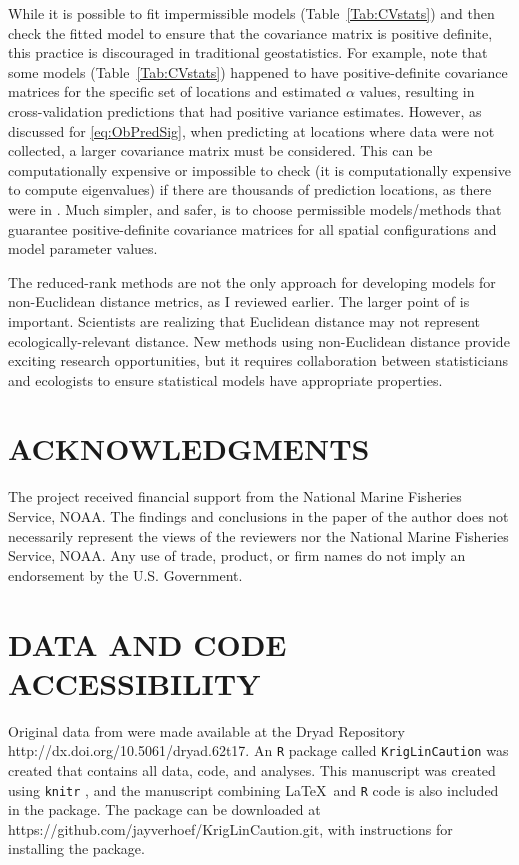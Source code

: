 \documentclass[11pt, titlepage]{article}\usepackage[]{graphicx}\usepackage[]{color}
\begin{document}
\begin{spacing}{1.9}
\begin{flushleft}
While it is possible to fit impermissible models (Table~\ref{Tab:CVstats}) and then check the fitted model to ensure that the covariance matrix is positive definite, this practice is discouraged in traditional geostatistics. For example, note that some models (Table~\ref{Tab:CVstats}) happened to have positive-definite covariance matrices for the specific set of locations and estimated $\alpha$ values, resulting in cross-validation predictions that had positive variance estimates.  However, as discussed for \ref{eq:ObPredSig}, when predicting at locations where data were not collected, a larger covariance matrix must be considered. This can be computationally expensive or impossible to check (it is computationally expensive to compute eigenvalues) if there are thousands of prediction locations, as there were in \citet{Ladl:Avga:Whea:Boyc:pred:2016}. Much simpler, and safer, is to choose permissible models/methods that guarantee positive-definite covariance matrices for all spatial configurations and model parameter values. 

The reduced-rank methods are not the only approach for developing models for non-Euclidean distance metrics, as I reviewed earlier. The larger point of \citet{Ladl:Avga:Whea:Boyc:pred:2016} is important. Scientists are realizing that Euclidean distance may not represent ecologically-relevant distance.  New methods using non-Euclidean distance provide exciting research opportunities, but it requires collaboration between statisticians and ecologists to ensure statistical models have appropriate properties. 

\section*{ACKNOWLEDGMENTS} 

The project received financial support from the National Marine Fisheries Service, NOAA. The findings and conclusions in the paper of the author does not necessarily represent the views of the reviewers nor the National Marine Fisheries Service, NOAA. Any use of trade, product, or firm names do not imply an endorsement by the U.S. Government. 

\section*{DATA AND CODE ACCESSIBILITY}

Original data from \citet{Ladl:Avga:Whea:Boyc:pred:2016} were made available at the Dryad Repository http://dx.doi.org/10.5061/dryad.62t17. An \texttt{R} \citep{R:Deve:Core:ALan:2017} package called \texttt{KrigLinCaution} was created that contains all data, code, and analyses. This manuscript was created using \texttt{knitr} \citep{Yihu:impl:2014,Yihu:dyna:2015,Yihu:knit:2016}, and the manuscript combining \LaTeX\ and \texttt{R} code is also included in the package.  The package can be downloaded at https://github.com/jayverhoef/KrigLinCaution.git, with instructions for installing the package.


\end{flushleft}
\end{spacing}
\end{document}
